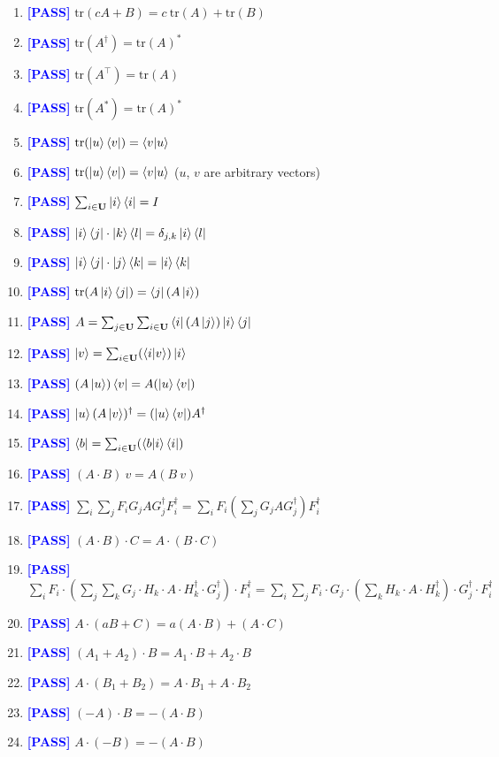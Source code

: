 \documentclass[manuscript, review, timestamp]{acmart}
\newcommand{\tr}{\mathrm{tr}}
\newcommand{\pass}{\textcolor{blue}{\textbf{ [PASS] }}}
\begin{document}
\begin{enumerate}
  \item \pass $\tr(c A + B) = c\ \tr(A) + \tr(B)$
  \item \pass $\tr(A^\dagger) = \tr(A)^*$
  \item \pass $\tr(A^\top) = \tr(A)$
  \item \pass $\tr(A^*) = \tr(A)^*$
  \item \pass $\tr(\ket{u}\bra{v}) = \braket{v|u}$
  \item \pass $\tr(\ket{u}\bra{v}) = \braket{v|u}$ ($u$, $v$ are arbitrary vectors)
  \item \pass $\sum_{i\in\mathbf{U}} \ket{i}\bra{i} = I$
  \item \pass $\ket{i}\bra{j}\cdot\ket{k}\bra{l} = \delta_{j,k}\ket{i}\bra{l}$
  \item \pass $\ket{i}\bra{j}\cdot\ket{j}\bra{k} = \ket{i}\bra{k}$
  \item \pass $\tr(A \ket{i}\bra{j}) = \bra{j} (A \ket{i})$
  \item \pass $A = \sum_{j\in\mathbf{U}}\sum_{i\in\mathbf{U}} \bra{i}(A\ket{j}) \ket{i}\bra{j}$
  \item \pass $\ket{v} = \sum_{i\in\mathbf{U}}(\braket{i|v})\ket{i}$
  \item \pass $(A\ket{u})\bra{v} = A(\ket{u}\bra{v})$
  \item \pass $\ket{u}(A\ket{v})^\dagger = (\ket{u}\bra{v})A^\dagger$
  \item \pass $\bra{b} = \sum_{i\in\mathbf{U}}(\braket{b|i}\bra{i})$
  \item \pass $(A\cdot B)\ v = A (B\ v)$
  \item \pass $\sum_{i}\sum_{j}F_i G_j A G_j^\dagger F_i^\dagger = \sum_i F_i (\sum_j G_j A G_j^\dagger) F_i^\dagger$
  \item \pass $(A\cdot B)\cdot C = A \cdot (B \cdot C)$
  \item \pass $\sum_i F_i \cdot (\sum_j \sum_k G_j \cdot H_k \cdot A \cdot H_k^\dagger \cdot G_j^\dagger) \cdot F_i^\dagger = \sum_i \sum_j F_i \cdot G_j \cdot (\sum_k H_k \cdot A \cdot H_k^\dagger) \cdot G_j^\dagger \cdot F_i^\dagger$
  \item \pass $A\cdot(a B + C) = a (A\cdot B) + (A\cdot C)$
  \item \pass $(A_1 + A_2)\cdot B = A_1 \cdot B + A_2 \cdot B$
  \item \pass $A \cdot (B_1 + B_2) = A \cdot B_1 + A \cdot B_2$
  \item \pass $(-A) \cdot B = - (A \cdot B)$
  \item \pass $A \cdot (-B) = - (A \cdot B)$

\end{enumerate}
\end{document}
